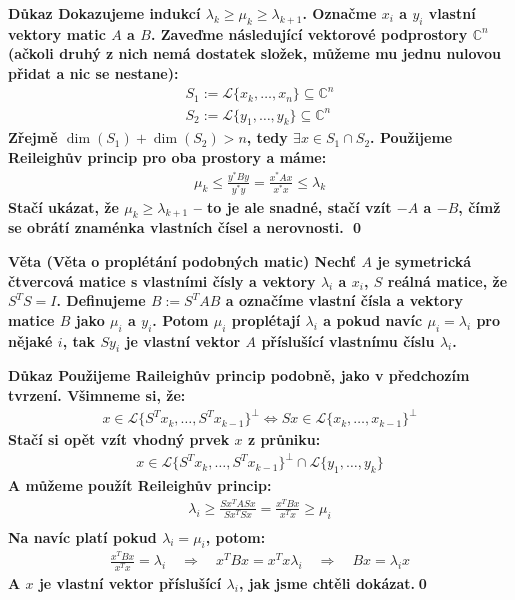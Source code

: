 \documentclass[a4paper,12pt,titlepage]{article}
\newcommand{\dk}{\smallskip\noindent\bf Důkaz\rm{} }
\newcommand{\vt}{\smallskip\noindent\bf Věta\rm{} }
\renewcommand{\L}{\mathcal{L}}
\newcommand{\C}{\mathbb{C}}
\renewcommand{\L}{\mathcal{L}}
\begin{document}
\dk Dokazujeme indukcí $\lambda_k \geq \mu_k \geq \lambda_{k+1}$. Označme $x_i$ 
a $y_i$ vlastní vektory matic $A$ a $B$.  Zaveďme následující vektorové 
podprostory $\C^n$ (ačkoli druhý z nich nemá dostatek složek, můžeme mu jednu 
nulovou přidat a nic se nestane):
\begin{align}
S_1 := \L\{x_k, \dots, x_n\} \subseteq \C^n \\
S_2 := \L\{y_1, \dots, y_k\} \subseteq \C^n
\end{align}
Zřejmě $\dim(S_1) + \dim(S_2) > n$, tedy $\exists x \in S_1\cap S_2$. Použijeme 
Reileighův princip pro oba prostory a máme:
\begin{align}
	\mu_k \leq \frac{y^*By}{y^*y} = \frac{x^*Ax}{x^*x} \leq \lambda_k
\end{align}
Stačí ukázat, že $\mu_k \geq \lambda_{k+1}$ -- to je ale snadné, stačí vzít $-A$ 
a $-B$, čímž se obrátí znaménka vlastních čísel a nerovnosti. \qed

\vt (Věta o proplétání podobných matic) Nechť $A$ je symetrická čtvercová matice 
s vlastními čísly a vektory $\lambda_i$ a $x_i$, $S$ reálná matice, že $S^TS=I$.  
Definujeme $B := S^TAB$ a označíme vlastní čísla a vektory matice $B$ jako 
$\mu_i$ a $y_i$. Potom $\mu_i$ proplétají $\lambda_i$ a pokud navíc $\mu_i = 
\lambda_i$ pro nějaké $i$, tak $Sy_i$ je vlastní vektor $A$ příslušící vlastnímu 
číslu $\lambda_i$.

\dk Použijeme Raileighův princip podobně, jako v předchozím tvrzení. Všimneme 
si, že:
\begin{align}
	x \in \L\{ S^Tx_k, \dots, S^Tx_{k-1}\}^\perp \Leftrightarrow
	Sx \in \L\{ x_k, \dots, x_{k-1}\}^\perp
\end{align}
Stačí si opět vzít vhodný prvek $x$ z průniku:
\begin{align}
	x \in \L\{ S^Tx_k, \dots, S^Tx_{k-1}\}^\perp \cap \L\{y_1, \dots, y_k\}
\end{align}
A můžeme použít Reileighův princip:
\begin{align}
	\lambda_i \geq \frac{Sx^TASx}{Sx^TSx} = \frac{x^TBx}{x^Tx} \geq \mu_i \\
\end{align}
Na navíc platí pokud $\lambda_i = \mu_i$, potom:
\begin{align}
	\frac{x^TBx}{x^Tx} = \lambda_i \quad\Rightarrow\quad x^TBx=x^Tx\lambda_i 
	\quad\Rightarrow\quad Bx = \lambda_i x
\end{align}
A $x$ je vlastní vektor příslušící $\lambda_i$, jak jsme chtěli dokázat.\qed
\end{document}
